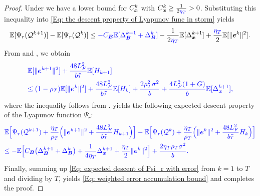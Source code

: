 \begin{proof}
    Under  we have a lower bound for $C_{\bm{x}}^{k}$ with $C_{\bm{x}}^{k}\geq\frac{1}{2{\color{blue}\eta_T}}>0$. Substituting this inequality into \eqref{Eq: the descent property of Lyapunov func in storm} yields
    \begin{align}
        \EE[\Psi_r(\calQ^{k+1})]-\EE[\Psi_r(\calQ^{k})]\leq\blue{-C_{\bB}\EE[\Delta_{\bB}^{k+1}+\Delta_{\bB}^{k}]}-\frac{1}{2\blue{\eta_T}}\EE[\Delta_{\bx}^{k+1}]+\frac{\blue{\eta_T}}{2}\EE[\|\be^{k}\|^{2}].
        \label{Eq: descent of Psi_r in weighted error bound}
    \end{align}
    From  and
    , we obtain
    \begin{align}
        &\blue{\EE[\|\be^{k+1}\|^{2}]+\frac{48L_F^{2}}{b\tilde\tau}\EE[H_{k+1}]}\notag\\
        &\blue{\leq(1-\rho_T)\EE[\|\be^{k}\|^{2}]+\frac{48L_F^{2}}{b\tilde\tau}\EE[H_{k}]+\frac{2\rho_T^{2}\sigma^{2}}{b}+\frac{4L_F^{2}(1+G)}{b}\EE[\Delta_{\bx}^{k+1}],}
        \label{Eq: error recursion with tracking}
    \end{align}
    where the inequality follows from .  yields the following expected descent property of the Lyapunov function $\Psi_r$:
    \begin{align}
        &\blue{\EE\Bigl[\Psi_r(\calQ^{k+1})+\frac{\eta_T}{\rho_T}\Bigl(\|\be^{k+1}\|^{2}+\frac{48L_F^{2}}{b\tilde\tau}H_{k+1}\Bigr)\Bigr]-\EE\Bigl[\Psi_r(\calQ^{k})+\frac{\eta_T}{\rho_T}\Bigl(\|\be^{k}\|^{2}+\frac{48L_F^{2}}{b\tilde\tau}H_{k}\Bigr)\Bigr]}\notag\\
        &\blue{\leq-\EE\Bigl[C_{\bB}\bigl(\Delta_{\bB}^{k+1}+\Delta_{\bB}^{k}\bigr)+\frac{1}{4\eta_T}\Delta_{\bx}^{k+1}+\frac{\eta_T}{2}\|\be^{k}\|^{2}\Bigr]+\frac{2\eta_T\rho_T\sigma^{2}}{b}.}
        \label{Eq: expected descent of Psi_r with error}
    \end{align}
    Finally, summing up \eqref{Eq: expected descent of Psi_r with error} from $k=1$ to $T$ and dividing by $T$,  yields \eqref{Eq: weighted error accumulation bound} and completes the proof.
\end{proof}

